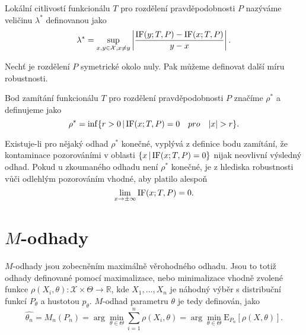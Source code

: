 \begin{definition}
	Lokální citlivostí funkcionálu $T$ pro rozdělení pravděpodobnosti $P$ nazýváme veličinu $\lambda^*$ definovanou jako
	\begin{equation}
			\lambda^* = \sup_{x,y \in \mathcal{X},x \neq y}  \left| \frac{\mathrm{IF}({y};T,P) - \mathrm{IF}({x};T,P)}{y-x} \right|.
	\end{equation}
\end{definition}

\noindent Nechť je rozdělení $P$ symetrické okolo nuly. Pak můžeme definovat další míru robustnosti.

\begin{definition}
	Bod zamítání funkcionálu $T$ pro rozdělení pravděpodobnosti $P$ značíme $\rho^*$ a definujeme jako
	\begin{equation}
			\rho^* = \inf \lbrace r>0 \, | \, \mathrm{IF}({x};T,P) = 0 \quad pro \quad |x| > r\rbrace.
	\end{equation}
\end{definition}

\noindent Existuje-li pro nějaký odhad $\rho^*$ konečné, vyplývá z definice bodu zamítání, že kontaminace pozorováními v oblasti $\lbrace x \, | \, \mathrm{IF}({x};T,P) = 0 \rbrace$ nijak neovlivní výsledný odhad. Pokud u zkoumaného odhadu není $\rho^*$ konečné, je z hlediska robustnosti vůči odlehlým pozorováním vhodné, aby platilo alespoň
\begin{equation}
	\lim_{x \rightarrow \pm\infty} \mathrm{IF}({x};T,P) = 0.
\end{equation}

\section{$M$-odhady}
$M$-odhady jsou zobecněním maximálně věrohodného odhadu. Jsou to totiž odhady definované pomocí maximalizace, nebo minimalizace vhodně zvolené funkce $\rho(X_i,\theta):\mathcal{X}\times \Theta \rightarrow \mathbb{R}$, kde $X_1,\ldots,X_n$ je náhodný výběr s distribuční funkcí $P_\theta$ a hustotou $p_\theta$. $M$-odhad parametru $\theta$ je tedy definován, jako 
\begin{equation}
	\hat{\theta_n} = M_n(P_n) = \arg \min_{\theta \in \Theta} \sum_{i=1}^n \rho(X_i,\theta) = \arg \min_{\theta \in \Theta} \mathrm{E}_{P_n}\left[ \rho(X,\theta) \right].
	\label{Modhad1}
\end{equation}

